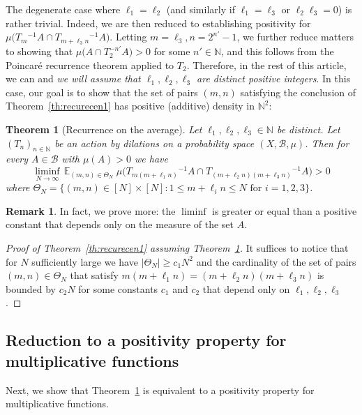 \documentclass[11pt]{amsart}
\newtheorem{theorem}[lemma]{Theorem}
\theoremstyle{definition}
\newtheorem*{remark}{Remark}
\begin{document}
 The degenerate case  where $\ell_1=\ell_2$ (and similarly if $\ell_1=\ell_3$ or $\ell_2\ell_3=0$)
is rather trivial. Indeed,
  we are then reduced to
establishing positivity for $\mu\bigl(T_{m}{^{-1}} A\cap
T_{m+\ell_3n}{^{-1}} A\bigr)$. Letting $m=\ell_3, n=2^{n'}-1$, we
further reduce matters to showing that $ \mu\bigl( A\cap T_2^{-n'}
A\bigr)>0 $ for some $n'\in {{\mathbb N}}$, and this follows from the Poincar\'e
recurrence theorem applied to  $T_2$. Therefore,   in the rest of
this article, we can and \emph{we will assume that $\ell_1,\ell_2,
\ell_3$ are distinct positive integers}. In this case, our goal is to  show that
the set of pairs $(m,n)$ satisfying the conclusion of
Theorem~\ref{th:recurecen1}  has positive (additive) density in
${{\mathbb N}}^2$:
\begin{theorem}[Recurrence on the average]
 \label{th:Recurrence}
 Let $\ell_1,\ell_2,\ell_3\in {{\mathbb N}}$ be  distinct.
  Let $(T_n)_{n\in{{\mathbb N}}}$ be an action by dilations on a probability
space $(X,{{\mathcal B}},\mu)$. Then for every $A\in {{\mathcal B}}$ with $\mu(A)>0$ we have
$$\liminf_{N\to\infty}\,
{{\mathbb E}}_{(m,n)\in\Theta_N}\;
\mu\bigl(T_{m(m+\ell_1n)}{^{-1}} A\cap
T_{(m+\ell_2n)(m+\ell_3n)}{^{-1}} A\bigr)>0
$$
where $\Theta_N=\{(m,n)\in[N]\times[N]\colon 1\leq m+\ell_in\leq N\text{ for }i=1,2,3
\}$.
\end{theorem}
\begin{remark}
\label{rem:three} In fact, we  prove more: the $\liminf$ is greater
or equal than  a positive constant that
 depends only on the measure of the set $A$.
\end{remark}
\begin{proof}[Proof of Theorem~\ref{th:recurecen1} assuming Theorem~\ref{th:Recurrence}]
It suffices to notice  that for $N$ sufficiently large we have $|\Theta_N|\geq c_1N^2$ and  the cardinality of the set of pairs $(m,n)\in\Theta_N$ that
satisfy $m(m+\ell_1n)=(m+\ell_2n)(m+\ell_3n)$ is bounded by $c_2N$ for some
constants $c_1$ and $c_2$ that depend only on $\ell_1,\ell_2, \ell_3$.
\end{proof}

\subsection{Reduction to a positivity property for multiplicative functions}\label{SS:redpos}
Next, we  show that Theorem~\ref{th:Recurrence} is equivalent to a
  positivity property for multiplicative functions.
  
 
\end{document}

